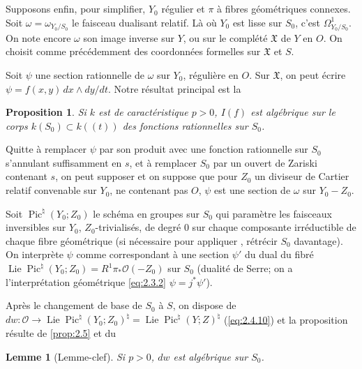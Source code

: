 \documentclass[12pt,a4paper]{article}
\theoremstyle{plain}
\newtheorem{lemma}{Lemme}
\newtheorem{proposition}{Proposition}
\theoremstyle{definition}
\theoremstyle{remark}
\DeclareMathOperator{\Lie}{Lie}
\DeclareMathOperator{\Pic}{Pic}
\newcommand{\OO}{\mathcal{O}}
\providecommand{\Lie}{\operatorname{Lie}}
\begin{document}
\subsection{}

Supposons enfin, pour simplifier, $Y_0$ régulier et $\pi$ à fibres géométriques
connexes. Soit $\omega=\omega_{Y_0/S_0}$ le faisceau dualisant relatif. Là où $Y_0$ est lisse sur
$S_0$, c'est $\Omega^1_{Y_0/S_0}$. On note encore $\omega$ son image inverse sur $Y$, ou sur le complété
$\mathfrak{X}$ de $Y$ en $O$. On choisit comme précédemment des coordonnées formelles sur
$\mathfrak{X}$ et $S$.

Soit $\psi$ une section rationnelle de $\omega$ sur $Y_0$, régulière en $O$. Sur
$\mathfrak{X}$, on peut écrire $\psi=f(x,y)\,dx\wedge dy/dt$. Notre résultat principal est la

\begin{proposition}\label{prop:3.2}
Si $k$ est de caractéristique $p>0$, $I(f)$ est algébrique sur le corps
$k(S_0)\subset k((t))$ des fonctions rationnelles sur $S_0$.
\end{proposition}

Quitte à remplacer $\psi$ par son produit avec une fonction rationnelle sur $S_0$
s'annulant suffisamment en $s$, et à remplacer $S_0$ par un ouvert de Zariski
contenant $s$, on peut supposer et on suppose que pour $Z_0$ un diviseur de
Cartier relatif convenable sur $Y_0$, ne contenant pas $O$, $\psi$ est une section de
$\omega$ sur $Y_0-Z_0$.

Soit $\Pic^\natural(Y_0;Z_0)$ le schéma en groupes sur $S_0$ qui paramètre les
faisceaux inversibles sur $Y_0$, $Z_0$-trivialisés, de degré $0$ sur chaque composante
irréductible de chaque fibre géométrique (si nécessaire pour appliquer
\cite{Raynaud1}, rétrécir $S_0$ davantage). On interprète $\psi$ comme correspondant
à une section $\psi'$ du dual du fibré
$\Lie\Pic^\natural(Y_0;Z_0)=R^1\pi_*\OO(-Z_0)$
sur $S_0$ (dualité de Serre; on a l'interprétation géométrique \eqref{eq:2.3.2}
$\psi=j^*\psi'$).

Après le changement de base de $S_0$ à $S$, on dispose de $dw:\OO\to\Lie\Pic^\natural(Y_0;Z_0)^\natural=\Lie\Pic^\natural(Y;Z)^\natural$ (\eqref{eq:2.4.10}) et la proposition résulte de \ref{prop:2.5} et du

\begin{lemma}[Lemme-clef]\label{lem:3.3}
Si $p>0$, $dw$ est algébrique sur $S_0$.
\end{lemma}
\end{document}
